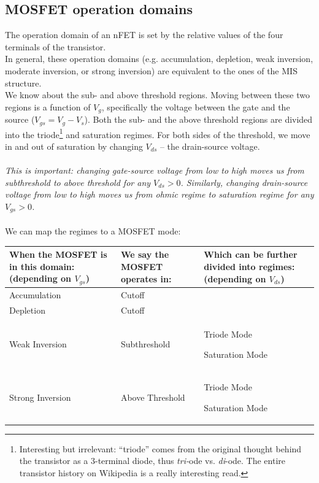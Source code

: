 \documentclass[main]{subfiles}
\begin{document}
\subsection{MOSFET operation domains}
The operation domain of an nFET is set by the relative values of the four terminals of the transistor.\\
In general, these operation domains (e.g. accumulation, depletion, weak inversion, moderate inversion, or strong inversion) are equivalent to the ones of the MIS structure.\\
We know about the sub- and above threshold regions. Moving between these two regions is a function of $V_g$, specifically the voltage between the gate and the source ($V_{gs} = V_g - V_s$). Both the sub- and the above threshold regions are divided into the triode\footnote{Interesting but irrelevant: ``triode'' comes from the original thought behind the transistor as a 3-terminal diode, thus \emph{tri-}ode vs. \emph{di}-ode. The entire transistor history on Wikipedia is a really interesting read.} and saturation regimes. For both sides of the threshold, we move in and out of saturation by changing $V_{ds}$ – the drain-source voltage.\\ \\
\textsl{This is important: changing \emph{gate-source} voltage from low to high moves us from subthreshold to above threshold for \emph{any} $V_{ds} > 0$. Similarly, changing \emph{drain-source} voltage from low to high moves us from ohmic regime to saturation regime for \emph{any} $V_{gs} > 0$.} \\ \\

We can map the regimes to a MOSFET mode:


\begin{longtable}{ |p{4.5cm}|p{3.5cm}|p{4.5cm}| }
\hline
\textbf{When the MOSFET is in this domain: \newline (depending on $V_{gs}$)} & \textbf{We say the MOSFET operates in:} & \textbf{Which can be further divided into regimes: \newline (depending on $V_{ds}$)} \\ \hline
\endhead
Accumulation & Cutoff & \\ \hline
Depletion & Cutoff & \\ \hline

Weak Inversion & Subthreshold & Triode Mode \par Saturation Mode\\ \hline
 Strong Inversion & Above Threshold & Triode Mode \par Saturation Mode\\ \hline
\end{longtable}
\end{document}
